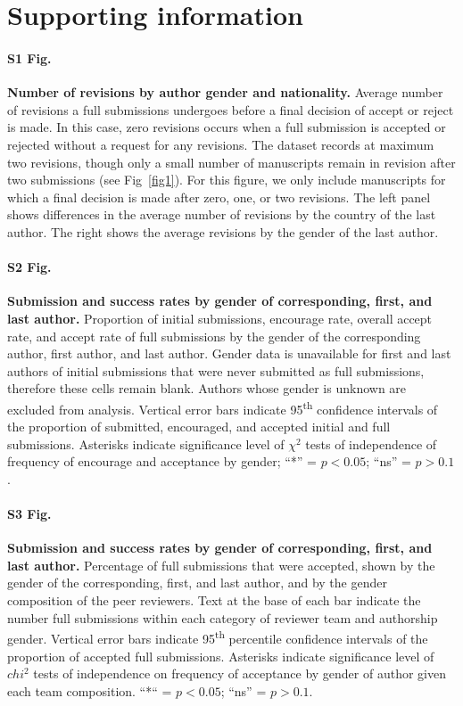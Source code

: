 \documentclass[10pt,letterpaper]{article}
\begin{document}
%
%
\section*{Supporting information}

\paragraph*{S1 Fig.}
\label{S1_Fig}
{\bf Number of revisions by author gender and nationality.} Average number of revisions a full submissions undergoes before a final decision of accept or reject is made. In this case, zero revisions occurs when a full submission is accepted or rejected without a request for any revisions. The dataset records at maximum two revisions, though only a small number of manuscripts remain in revision after two submissions (see Fig~\ref{fig1}). For this figure, we only include manuscripts for which a final decision is made after zero, one, or two revisions. The left panel shows differences in the average number of revisions by the country of the last author. The right shows the average revisions by the gender of the last author.

\paragraph*{S2 Fig.}
\label{S2_Fig}
{\bf Submission and success rates by gender of corresponding, first, and last author.} Proportion of initial submissions, encourage rate, overall accept rate, and accept rate of full submissions by the gender of the corresponding author, first author, and last author. Gender data is unavailable for first and last authors of initial submissions that were never submitted as full submissions, therefore these cells remain blank. Authors whose gender is unknown are excluded from analysis. Vertical error bars indicate 95\textsuperscript{th} confidence intervals of the proportion of submitted, encouraged, and accepted initial and full submissions. Asterisks indicate significance level of $\chi^{2}$ tests of independence of frequency of encourage and acceptance by gender; “*” = $p < 0.05$; “ns” = $p > 0.1$.

\paragraph*{S3 Fig.}
\label{S3_Fig}
{\bf Submission and success rates by gender of corresponding, first, and last author.} Percentage of full submissions that were accepted, shown by the gender of the corresponding, first, and last author, and by the gender composition of the peer reviewers. Text at the base of each bar indicate the number full submissions within each category of reviewer team and authorship gender. Vertical error bars indicate 95\textsuperscript{th} percentile confidence intervals of the proportion of accepted full submissions. Asterisks indicate significance level of $chi^{2}$ tests of independence on frequency of acceptance by gender of author given each team composition. “*“ = $p < 0.05$; “ns” = $p > 0.1$.
\end{document}
